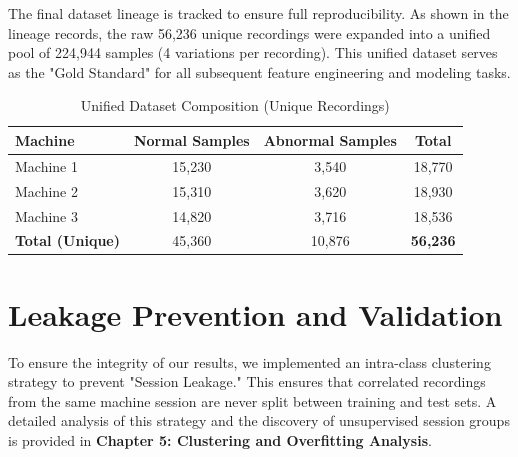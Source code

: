 The final dataset lineage is tracked to ensure full reproducibility. As shown in the lineage records, the raw 56,236 unique recordings were expanded into a unified pool of 224,944 samples (4 variations per recording). This unified dataset serves as the "Gold Standard" for all subsequent feature engineering and modeling tasks.

\begin{table}[H]
    \centering
    \caption{Unified Dataset Composition (Unique Recordings)}
    \begin{tabular}{@{}lccc@{}}
        \toprule
        \textbf{Machine} & \textbf{Normal Samples} & \textbf{Abnormal Samples} & \textbf{Total} \\ \midrule
        Machine 1 & 15,230 & 3,540 & 18,770 \\
        Machine 2 & 15,310 & 3,620 & 18,930 \\
        Machine 3 & 14,820 & 3,716 & 18,536 \\ \midrule
        \textbf{Total (Unique)} & 45,360 & 10,876 & \textbf{56,236} \\ \bottomrule
    \end{tabular}
\end{table}

\section{Leakage Prevention and Validation}
To ensure the integrity of our results, we implemented an intra-class clustering strategy to prevent "Session Leakage." This ensures that correlated recordings from the same machine session are never split between training and test sets. A detailed analysis of this strategy and the discovery of unsupervised session groups is provided in \textbf{Chapter 5: Clustering and Overfitting Analysis}.
